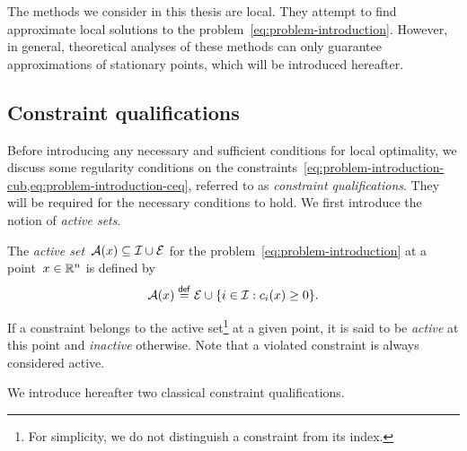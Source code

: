 The methods we consider in this thesis are local.
They attempt to find approximate local solutions to the problem~\cref{eq:problem-introduction}.
However, in general, theoretical analyses of these methods can only guarantee approximations of stationary points, which will be introduced hereafter.

\subsection{Constraint qualifications}

Before introducing any necessary and sufficient conditions for local optimality, we discuss some regularity conditions on the constraints~\cref{eq:problem-introduction-cub,eq:problem-introduction-ceq}, referred to as \emph{constraint qualifications}.
They will be required for the necessary conditions to hold.
We first introduce the notion of \emph{active sets}.

\begin{definition}
    \label{def:active-set}
    The \emph{active set}~$\act(\iter) \subseteq \iub \cup \ieq$ for the problem~\cref{eq:problem-introduction} at a point~$\iter \in \R^n$ is defined by
    \begin{equation*}
        \act(\iter) \eqdef \ieq \cup \set{i \in \iub : \con{i}(\iter) \ge 0}.
    \end{equation*}
\end{definition}

If a constraint belongs to the active set\footnote{For simplicity, we do not distinguish a constraint from its index.} at a given point, it is said to be \emph{active} at this point and \emph{inactive} otherwise.
Note that a violated constraint is always considered active.

We introduce hereafter two classical constraint qualifications.


